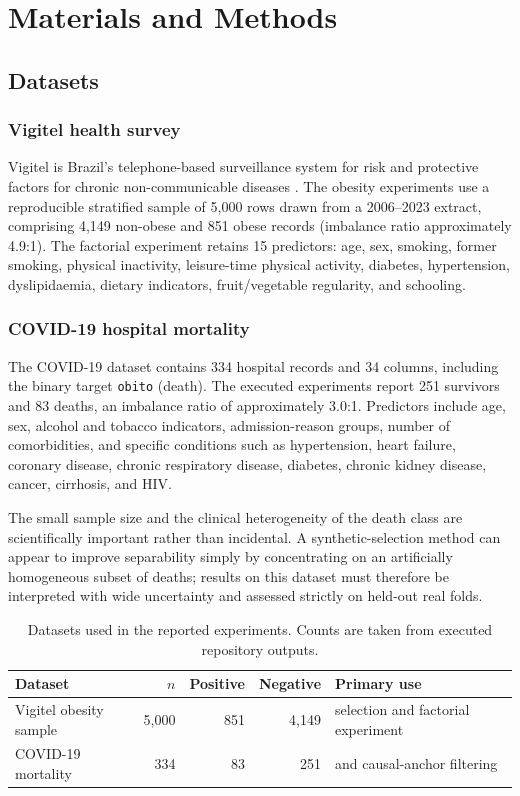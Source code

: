 \section{Materials and Methods}
\label{sec:methods}

\subsection{Datasets}
\label{sec:datasets}

\subsubsection{Vigitel health survey}

Vigitel is Brazil's telephone-based surveillance system for risk and protective factors for chronic non-communicable diseases \citep{bernal2017}. The obesity experiments use a reproducible stratified sample of 5,000 rows drawn from a 2006--2023 extract, comprising 4,149 non-obese and 851 obese records (imbalance ratio approximately 4.9:1). The factorial experiment retains 15 predictors: age, sex, smoking, former smoking, physical inactivity, leisure-time physical activity, diabetes, hypertension, dyslipidaemia, dietary indicators, fruit/vegetable regularity, and schooling.

\subsubsection{COVID-19 hospital mortality}

The COVID-19 dataset contains 334 hospital records and 34 columns, including the binary target \texttt{obito} (death). The executed experiments report 251 survivors and 83 deaths, an imbalance ratio of approximately 3.0:1. Predictors include age, sex, alcohol and tobacco indicators, admission-reason groups, number of comorbidities, and specific conditions such as hypertension, heart failure, coronary disease, chronic respiratory disease, diabetes, chronic kidney disease, cancer, cirrhosis, and HIV.

The small sample size and the clinical heterogeneity of the death class are scientifically important rather than incidental. A synthetic-selection method can appear to improve separability simply by concentrating on an artificially homogeneous subset of deaths; results on this dataset must therefore be interpreted with wide uncertainty and assessed strictly on held-out real folds.

\begin{table}[htbp]
\centering
\caption{Datasets used in the reported experiments. Counts are taken from executed repository outputs.}
\label{tab:datasets}
\begin{tabularx}{\textwidth}{lrrrX}
\toprule
Dataset & $n$ & Positive & Negative & Primary use\\
\midrule
Vigitel obesity sample & 5,000 & 851 & 4,149 & \sepa{} selection and factorial \tstr{} experiment\\
COVID-19 mortality & 334 & 83 & 251 & \sepa{} and \dacpf{} causal-anchor filtering\\
\bottomrule
\end{tabularx}
\end{table}

